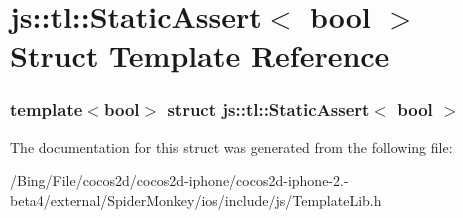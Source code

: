 \hypertarget{structjs_1_1tl_1_1_static_assert}{\section{js\-:\-:tl\-:\-:Static\-Assert$<$ bool $>$ Struct Template Reference}
\label{structjs_1_1tl_1_1_static_assert}
}
\subsubsection*{template$<$bool$>$ struct js\-::tl\-::\-Static\-Assert$<$ bool $>$}



The documentation for this struct was generated from the following file\-:\begin{DoxyCompactItemize}
\item 
/\-Bing/\-File/cocos2d/cocos2d-\/iphone/cocos2d-\/iphone-\/2.-\/beta4/external/\-Spider\-Monkey/ios/include/js/Template\-Lib.\-h\end{DoxyCompactItemize}
